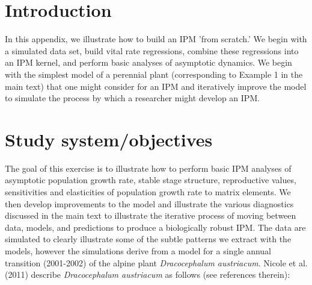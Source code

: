\documentclass[11pt]{article}
\begin{document}
\newpage


\section{Introduction}
\label{sec:Introduction}
In this appendix, we illustrate how to build an IPM 'from scratch.' We begin with a simulated data set, build vital rate regressions, combine these regressions into an IPM kernel, and perform basic analyses of asymptotic dynamics. We begin with the simplest model of a perennial plant (corresponding to Example 1 in the main text) that one might consider for an IPM and iteratively improve the model to simulate the process by which a researcher might develop an IPM.



\section{Study system/objectives}
\label{sec:Study system/objectives}

The goal of this exercise is to illustrate how to perform basic IPM analyses of asymptotic population growth rate, stable stage structure, reproductive values, sensitivities and elasticities of population growth rate to matrix elements. We then develop improvements to the model and illustrate the various diagnostics discussed in the main text to illustrate the iterative process of moving between data, models, and predictions to produce a biologically robust IPM. The data are simulated to clearly illustrate some of the subtle patterns we extract with the models, however the simulations derive from a model for a single annual transition (2001-2002) of the alpine plant \emph{Dracocephalum austriacum}. Nicole et al. (2011) describe \emph{Dracocephalum austriacum} as follows (see references therein):
\end{document}
